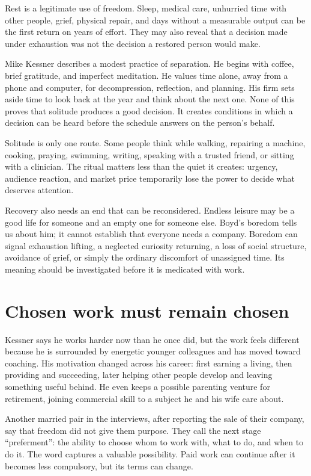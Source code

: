 Rest is a legitimate use of freedom. Sleep, medical care, unhurried time with
other people, grief, physical repair, and days without a measurable output can
be the first return on years of effort. They may also reveal that a decision
made under exhaustion was not the decision a restored person would make.

Mike Kessner describes a modest practice of separation. He begins with coffee,
brief gratitude, and imperfect meditation. He values time alone, away from a
phone and computer, for decompression, reflection, and planning. His firm sets
aside time to look back at the year and think about the next one. None of this
proves that solitude produces a good decision. It creates conditions in which
a decision can be heard before the schedule answers on the person's behalf.

Solitude is only one route. Some people think while walking, repairing a
machine, cooking, praying, swimming, writing, speaking with a trusted friend,
or sitting with a clinician. The ritual matters less than the quiet it creates:
urgency, audience reaction, and market price temporarily lose the power to
decide what deserves attention.

Recovery also needs an end that can be reconsidered. Endless leisure may be a
good life for someone and an empty one for someone else. Boyd's boredom tells
us about him; it cannot establish that everyone needs a company. Boredom can
signal exhaustion lifting, a neglected curiosity returning, a loss of social
structure, avoidance of grief, or simply the ordinary discomfort of
unassigned time. Its meaning should be investigated before it is medicated
with work.

\section{Chosen work must remain chosen}

Kessner says he works harder now than he once did, but the work feels different
because he is surrounded by energetic younger colleagues and has moved toward
coaching. His motivation changed across his career: first earning a living,
then providing and succeeding, later helping other people develop and leaving
something useful behind. He even keeps a possible parenting venture for
retirement, joining commercial skill to a subject he and his wife care about.

Another married pair in the interviews, after reporting the sale of their
company, say that freedom did not give them purpose. They call the next stage
“preferment”: the ability to choose whom to work with, what to do, and when to
do it. The word captures a valuable possibility. Paid work can continue after
it becomes less compulsory, but its terms can change.

